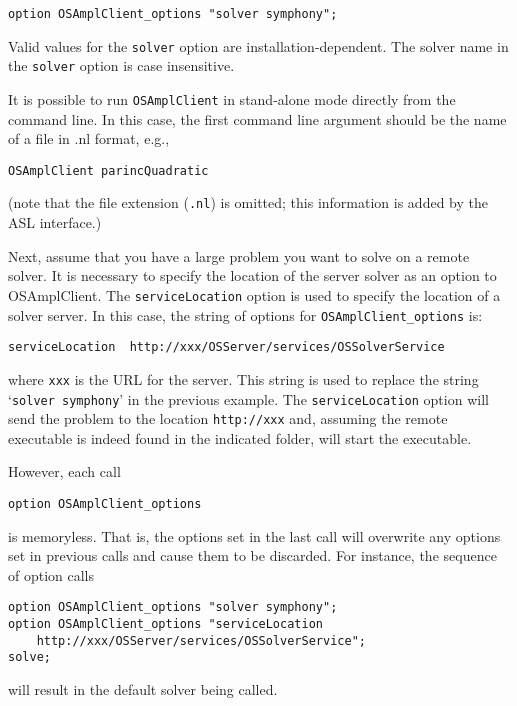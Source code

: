 \begin{verbatim}
option OSAmplClient_options "solver symphony";
\end{verbatim}

Valid values for the {\tt solver} option are installation-dependent.
The solver name in the {\tt solver} option is case insensitive.  

\ifbible
\medskip
It is possible to run {\tt OSAmplClient} in stand-alone mode directly from the command line. In this case, the first command line argument should be the name of a file in .nl format, e.g.,

\begin{verbatim}
OSAmplClient parincQuadratic
\end{verbatim}

\noindent (note that the file extension ({\tt .nl}) is omitted; this information is added by the ASL interface.)
\fi


\label{section:remoteampl}

Next, assume that you have a large problem you want to solve on a remote solver. It is necessary 
to specify the location of the server solver as an option to OSAmplClient. 
The {\tt serviceLocation} option is used to specify the location of a solver server. 
In this case, the string of options for {\tt OSAmplClient\_options} is:

\begin{verbatim}
serviceLocation  http://xxx/OSServer/services/OSSolverService
\end{verbatim}
where {\tt xxx} is the URL for the server.  This string is used to replace the string `{\tt solver symphony}' in the previous example. 
The {\tt serviceLocation} option will send the problem to the %
location {\tt http://xxx} and, assuming the remote executable is indeed found 
in the indicated folder, will start the executable.  


\medskip


However, each call 
\begin{verbatim}
option OSAmplClient_options
\end{verbatim}
is memoryless. That is, the options set in the last call will overwrite any options set in previous calls
and cause them to be discarded.  For instance, the sequence of option calls
\begin{verbatim}
option OSAmplClient_options "solver symphony";
option OSAmplClient_options "serviceLocation  
    http://xxx/OSServer/services/OSSolverService";
solve;
\end{verbatim}
will result in the default solver being called. 

